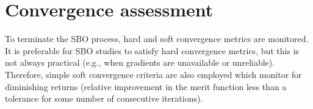 
\section{Convergence assessment} \label{sbm:sblm_con_hard}

To terminate the SBO process, hard and soft convergence metrics are
monitored.  It is preferable for SBO studies to satisfy hard
convergence metrics, but this is not always practical (e.g., when
gradients are unavailable or unreliable).  Therefore, simple soft
convergence criteria are also employed which monitor for diminishing
returns (relative improvement in the merit function less than a
tolerance for some number of consecutive iterations).

